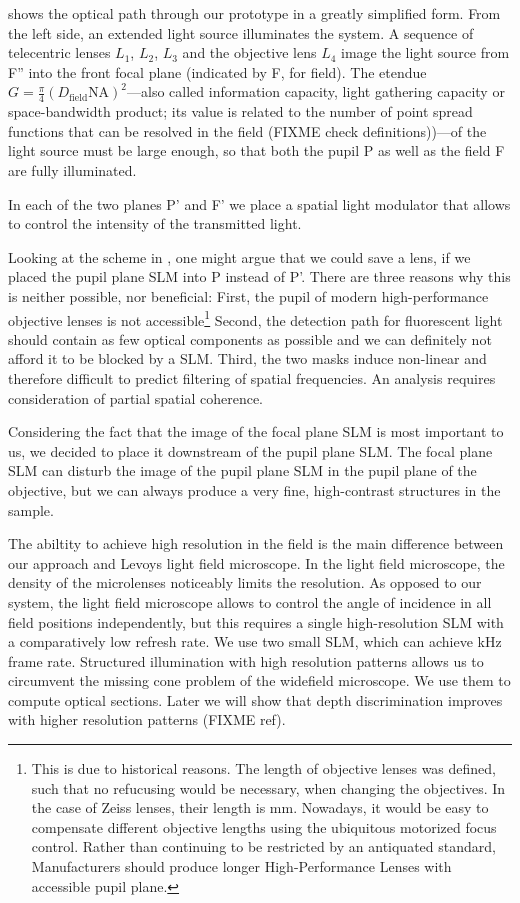  shows the optical path through our prototype
in a greatly simplified form.  From the left side, an extended light
source illuminates the system. A sequence of telecentric lenses $L_1$,
$L_2$, $L_3$ and the objective lens $L_4$ image the light source from
F'' into the front focal plane (indicated by F, for field). The
etendue $G=\frac{\pi}{4}(D_\textrm{field}\textrm{NA})^2$---also called
information capacity, light gathering capacity or space-bandwidth
product; its value is related to the number of point spread functions
that can be resolved in the field (FIXME check definitions))---of the
light source must be large enough, so that both the pupil P as well as
the field F are fully illuminated.

In each of the two planes P' and F' we place a spatial light modulator
that allows to control the intensity of the transmitted light.

Looking at the scheme in , one might argue
that we could save a lens, if we placed the pupil plane SLM into P
instead of P'. There are three reasons why this is neither possible,
nor beneficial: First, the pupil of modern high-performance objective
lenses is not accessible\footnote{This is due to historical reasons.
  The length of objective lenses was defined, such that no refucusing
  would be necessary, when changing the objectives. In the case of
  Zeiss lenses, their length is \unit[45]{mm}. Nowadays, it would be
  easy to compensate different objective lengths using the ubiquitous
  motorized focus control.  Rather than continuing to be restricted by
  an antiquated standard, Manufacturers should produce longer
  High-Performance Lenses with accessible pupil plane.}  Second, the
detection path for fluorescent light should contain as few optical
components as possible and we can definitely not afford it to be
blocked by a SLM.  Third, the two masks induce non-linear and
therefore difficult to predict filtering of spatial frequencies. An
analysis requires consideration of partial spatial coherence.

Considering the fact that the image of the focal plane SLM is most
important to us, we decided to place it downstream of the pupil plane
SLM. The focal plane SLM can disturb the image of the pupil plane SLM
in the pupil plane of the objective, but we can always produce a very
fine, high-contrast structures in the sample.

The abiltity to achieve high resolution in the field is the main
difference between our approach and Levoys light field microscope.  In
the light field microscope, the density of the microlenses noticeably
limits the resolution. As opposed to our system, the light field microscope allows to
control the angle of incidence in all field positions independently,
but this requires a single high-resolution SLM with a comparatively
low refresh rate. We use two small SLM, which can achieve
\unit[1]{kHz} frame rate. Structured illumination with high resolution
patterns allows us to circumvent the missing cone problem of the
widefield microscope. We use them to compute optical sections. Later
we will show that depth discrimination improves with higher resolution
patterns (FIXME ref).
